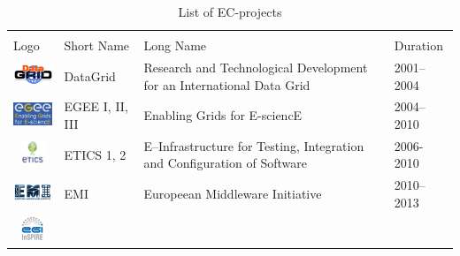\documentclass[journal]{IEEEtran}
\begin{document}
\begin{table}[!h]
\renewcommand{\arraystretch}{1.3}
\caption{List of EC-projects}
\label{tab:eup}
\centering
\begin{tabular}{p{1.6cm}p{1.5cm}p{3cm}l}
\hline
\hline
\\
Logo & Short Name & Long Name & Duration\\
\hline
\hline
\begin{minipage}{.3\textwidth}
\includegraphics[width=15mm,height=7.5mm]{images/datagrid}
\end{minipage}
    & DataGrid &
Research and Technological Development for an International Data Grid & 2001--2004\\
\begin{minipage}{.3\textwidth}
\includegraphics[width=15mm,height=7.5mm]{images/egee}
\end{minipage}
     & EGEE I, II, III &
Enabling Grids for E-sciencE & 2004--2010\\
\begin{minipage}{.3\textwidth}
\includegraphics[width=15mm,height=7.5mm]{images/etics}
\end{minipage}
     & ETICS 1, 2 &
E--Infrastructure for Testing, Integration and Configuration of Software & 2006-2010\\
\begin{minipage}{.3\textwidth}
\includegraphics[width=15mm,height=7.5mm]{images/emi}
\end{minipage}
     & EMI &
Europeean Middleware Initiative & 2010--2013\\
\begin{minipage}{.3\textwidth}
\includegraphics[width=15mm,height=7.5mm]{images/egi-inspire}

\end{minipage}
\end{tabular}
\end{table}
\end{document}
